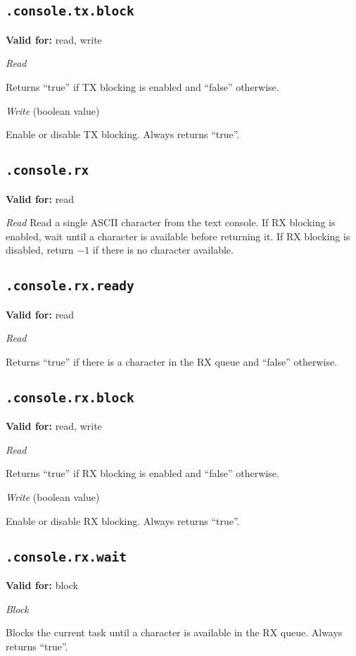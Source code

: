 \documentclass{article}
\begin{document}
\subsection{\texttt{.console.tx.block}}
\textbf{Valid for:} read, write

\textit{Read}

Returns ``true'' if TX blocking is enabled and ``false'' otherwise.

\textit{Write} (boolean value)

Enable or disable TX blocking. Always returns ``true''.

\subsection{\texttt{.console.rx}}
\textbf{Valid for:} read

\textit{Read}
Read a single ASCII character from the text console. If RX blocking is enabled, wait until a character is available before returning it.
If RX blocking is disabled, return $-1$ if there is no character available.

\subsection{\texttt{.console.rx.ready}}
\textbf{Valid for:} read

\textit{Read}

Returns ``true'' if there is a character in the RX queue and ``false'' otherwise.

\subsection{\texttt{.console.rx.block}}
\textbf{Valid for:} read, write

\textit{Read}

Returns ``true'' if RX blocking is enabled and ``false'' otherwise.

\textit{Write} (boolean value)

Enable or disable RX blocking. Always returns ``true''.

\subsection{\texttt{.console.rx.wait}}
\textbf{Valid for:} block

\textit{Block}

Blocks the current task until a character is available in the RX queue. Always returns ``true''.
\end{document}
